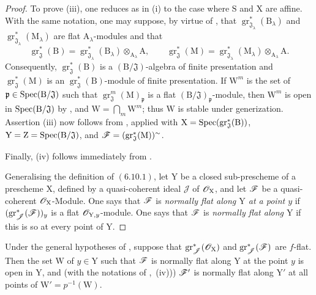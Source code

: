 \begin{proof}
To prove (iii), one reduces as in (i) to the case where $\mathrm{S}$ and $\mathrm{X}$ are affine. With the same notation, one may suppose, by virtue of , that $\operatorname{gr}^*_{\mathfrak{J}_\lambda}(\mathrm{B}_\lambda)$ and $\operatorname{gr}^*_{\mathfrak{J}_\lambda}(\mathrm{M}_\lambda)$ are flat $\mathrm{A}_\lambda$-modules and that
\[
\operatorname{gr}^*_\mathfrak{J}(\mathrm{B})
=\operatorname{gr}^*_{\mathfrak{J}_\lambda}(\mathrm{B}_\lambda)\otimes_{\mathrm{A}_\lambda}\mathrm{A},
\qquad
\operatorname{gr}^*_\mathfrak{J}(\mathrm{M})
=\operatorname{gr}^*_{\mathfrak{J}_\lambda}(\mathrm{M}_\lambda)\otimes_{\mathrm{A}_\lambda}\mathrm{A}.
\]
Consequently, $\operatorname{gr}^*_\mathfrak{J}(\mathrm{B})$ is a $(\mathrm{B}/\mathfrak{J})$-algebra of finite presentation and $\operatorname{gr}^*_\mathfrak{J}(\mathrm{M})$ is an $\operatorname{gr}^*_\mathfrak{J}(\mathrm{B})$-module of finite presentation. If $\mathrm{W}^m$ is the set of $\mathfrak{p}\in\operatorname{Spec}(\mathrm{B}/\mathfrak{J})$ such that $\operatorname{gr}^m_\mathfrak{J}(\mathrm{M})_{\mathfrak{p}}$ is a flat $(\mathrm{B}/\mathfrak{J})_{\mathfrak{p}}$-module, then $\mathrm{W}^m$ is open in $\operatorname{Spec}(\mathrm{B}/\mathfrak{J})$ by , and $\mathrm{W}=\bigcap_m\mathrm{W}^m$; thus $\mathrm{W}$ is stable under generization. Assertion (iii) now follows from , applied with $\mathrm{X}=\operatorname{Spec}(\operatorname{gr}^*_\mathfrak{J}(\mathrm{B}))$, $\mathrm{Y}=\mathrm{Z}=\operatorname{Spec}(\mathrm{B}/\mathfrak{J})$, and $\mathscr{F}=(\operatorname{gr}^*_\mathfrak{J}(\mathrm{M}))^\sim$.

Finally, (iv) follows immediately from .

Generalising the definition of $(6.10.1)$, let $\mathrm{Y}$ be a closed sub-prescheme of a prescheme $\mathrm{X}$, defined by a quasi-coherent ideal $\mathscr{J}$ of $\mathscr{O}_\mathrm{X}$, and let $\mathscr{F}$ be a quasi-coherent $\mathscr{O}_\mathrm{X}$-Module. One says that $\mathscr{F}$ is \emph{normally flat along $\mathrm{Y}$ at a point $y$} if $(\operatorname{gr}^*_\mathscr{J}(\mathscr{F}))_y$ is a flat $\mathscr{O}_{\mathrm{Y},y}$-module. One says that $\mathscr{F}$ is \emph{normally flat along $\mathrm{Y}$} if this is so at every point of $\mathrm{Y}$.
\end{proof}

\begin{corollary}[11.3.5]
\label{IV.11.3.5}
Under the general hypotheses of , suppose that $\operatorname{gr}^*_\mathscr{J}(\mathscr{O}_\mathrm{X})$ and $\operatorname{gr}^*_\mathscr{J}(\mathscr{F})$ are $f$-flat. Then the set $\mathrm{W}$ of $y\in\mathrm{Y}$ such that $\mathscr{F}$ is normally flat along $\mathrm{Y}$ at the point $y$ is open in $\mathrm{Y}$, and (with the notations of ,~(iv))) $\mathscr{F}'$ is normally flat along $\mathrm{Y}'$ at all points of $\mathrm{W}'=p^{-1}(\mathrm{W})$.
\end{corollary}

